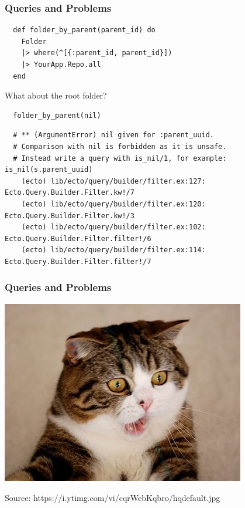 \documentclass{beamer}
\begin{document}
\begin{frame}[fragile]
\frametitle{Queries and Problems}
\begin{verbatim}
  def folder_by_parent(parent_id) do
    Folder
    |> where(^[{:parent_id, parent_id}])
    |> YourApp.Repo.all
  end
\end{verbatim}
\pause
\centerline{What about the root folder?}
\begin{verbatim}
  folder_by_parent(nil)
\end{verbatim}
\pause
\begin{tiny}
\begin{verbatim}
  # ** (ArgumentError) nil given for :parent_uuid.
  # Comparison with nil is forbidden as it is unsafe.
  # Instead write a query with is_nil/1, for example: is_nil(s.parent_uuid)
    (ecto) lib/ecto/query/builder/filter.ex:127: Ecto.Query.Builder.Filter.kw!/7
    (ecto) lib/ecto/query/builder/filter.ex:120: Ecto.Query.Builder.Filter.kw!/3
    (ecto) lib/ecto/query/builder/filter.ex:102: Ecto.Query.Builder.Filter.filter!/6
    (ecto) lib/ecto/query/builder/filter.ex:114: Ecto.Query.Builder.Filter.filter!/7

\end{verbatim}
\end{tiny}
\end{frame}


\begin{frame}[fragile]
\frametitle{Queries and Problems}
\centerline{\includegraphics[width=0.8\textwidth]{shocked_cat.jpg}}
\begin{tiny}
\centerline{Source: https://i.ytimg.com/vi/cqrWebKqbro/hqdefault.jpg}
\end{tiny}
\end{frame}
\end{document}
